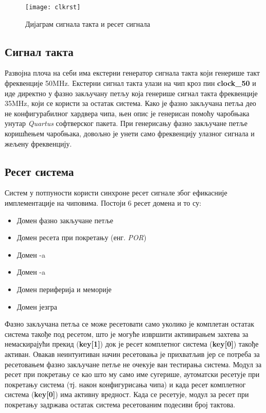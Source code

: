 \begin{figure}[h!]
	\centering
	\texttt{[image: clkrst]}
	\caption{Дијаграм сигнала такта и ресет сигнала}
	\label{fig:clkrst}
\end{figure}\newpage

\subsection{Сигнал такта}

Развојна плоча на себи има екстерни генератор сигнала такта који генерише такт фреквенције 50MHz. Екстерни сигнал такта улази на чип кроз пин \textbf{clock\_50} и иде директно у фазно закључану петљу која генерише сигнал такта фреквенције 35MHz, који се користи за остатак система. Како је фазно закључана петља део не конфигурабилног хардвера  чипа, њен опис је генерисан помоћу чаробњака унутар \textit{Quartus} софтверског пакета. При генерисању фазно закључане петље коришћењем чаробњака, довољно је унети само фреквенцију улазног сигнала и жељену фреквенцију.  

\subsection{Ресет система}

Систем у потпуности користи синхроне ресет сигнале због ефикасније имплементације на  чиповима. Постоји 6 ресет домена и то су:
\begin{itemize}
	\item Домен фазно закључане петље
	\item Домен ресета при покретању (енг. \textit{\acrfull{POR}})
	\item Домен -a
	\item Домен -a
	\item Домен периферија и меморије
	\item Домен језгра
\end{itemize}

Фазно закључана петља се може ресетовати само уколико је комплетан остатак система такође под ресетом, што је могуће извршити активирањем захтева за немаскирајући прекид (\textbf{key[1]}) док је ресет комплетног система (\textbf{key[0]}) такође активан. Овакав неинтуитиван начин ресетовања је прихватљив јер се потреба за ресетовањем фазно закључане петље не очекује ван тестирања система.
Модул за ресет при покретању се као што му само име сугерише, аутоматски ресетује при покретању система (тј. након конфигурисања  чипа) и када ресет комплетног система (\textbf{key[0]}) има активну вредност. Када се ресетује, модул за ресет при покретању задржава остатак система ресетованим подесиви број тактова.

